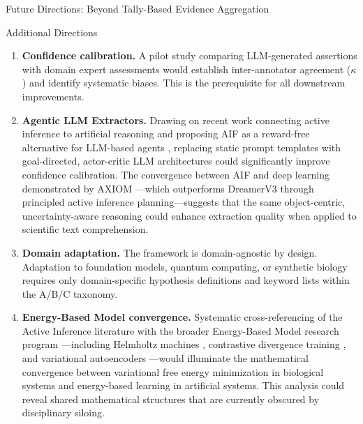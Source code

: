 \documentclass[
  ignorenonframetext,
]{beamer}
\begin{document}
\begin{frame}{Future Directions: Beyond Tally-Based Evidence
Aggregation}
\begin{block}{Additional Directions}
\protect{}\label{additional-directions}
\begin{enumerate}
\item
  \textbf{Confidence calibration.} A pilot study comparing LLM-generated
  assertions with domain expert assessments would establish
  inter-annotator agreement (\(\kappa\)) and identify systematic biases.
  This is the prerequisite for all downstream improvements.
\item
  \textbf{Agentic LLM Extractors.} Drawing on recent work connecting
  active inference to artificial reasoning \citep{friston2025active} and
  proposing AIF as a reward-free alternative for LLM-based agents
  \citep{wen2025missing}, replacing static prompt templates with
  goal-directed, actor-critic LLM architectures could significantly
  improve confidence calibration. The convergence between AIF and deep
  learning demonstrated by AXIOM \citep{heins2025axiom}---which
  outperforms DreamerV3 through principled active inference
  planning---suggests that the same object-centric, uncertainty-aware
  reasoning could enhance extraction quality when applied to scientific
  text comprehension.
\item
  \textbf{Domain adaptation.} The framework is domain-agnostic by
  design. Adaptation to foundation models, quantum computing, or
  synthetic biology requires only domain-specific hypothesis definitions
  and keyword lists within the A/B/C taxonomy.
\item
  \textbf{Energy-Based Model convergence.} Systematic cross-referencing
  of the Active Inference literature with the broader Energy-Based Model
  research program \citep{lecun2006tutorial}---including Helmholtz
  machines \citep{dayan1995helmholtz}, contrastive divergence training
  \citep{hinton2002training}, and variational autoencoders
  \citep{kingma2014auto}---would illuminate the mathematical convergence
  between variational free energy minimization in biological systems and
  energy-based learning in artificial systems. This analysis could
  reveal shared mathematical structures that are currently obscured by
  disciplinary siloing.
\end{enumerate}
\end{block}
\end{frame}
\end{document}
